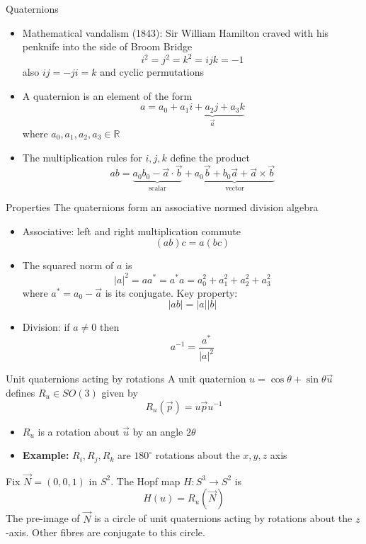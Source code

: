 \documentclass{beamer}
\newcommand{\R}{\mathbb{R}}
\newcommand{\va}{\vec{a}}
\newcommand{\vb}{\vec{b}}
\newcommand{\vu}{\vec{u}}
\newcommand{\vp}{\vec{p}}
\begin{document}
\begin{frame}{Quaternions}
	\begin{itemize}
		\pause
		\item Mathematical vandalism (1843): Sir William Hamilton craved with his penknife into the side of Broom Bridge
		\[
		i^2 = j^2 = k^2 = ijk = -1
		\]
		also \(ij = -ji = k\) and cyclic permutations
		\pause
		\item A quaternion is an element of the form 
		\[
		a = a_0 + \underbrace{a_1 i + a_2 j + a_3 k}_{\va}
		\]
		where \(a_0, a_1, a_2, a_3 \in \R\)
		\pause
		\item The multiplication rules for \(i, j, k\) define the product
		\[
		a b = \underbrace{a_0 b_0 - \va \cdot \vb}_{\text{scalar}} + \underbrace{a_0 \vb + b_0 \va + \va \times \vb}_{\text{vector}}
		\]
	\end{itemize}
\end{frame}

\begin{frame}{Properties}
	The quaternions form an associative normed division algebra 
	\begin{itemize}
		\pause
		\item Associative: left and right multiplication commute
		\[
		(ab)c = a(bc)
		\]
		\pause
		\item The squared norm of \(a\) is
		\[
		|a|^2 = a a^* = a^* a = a_0^2 + a_1^2 + a_2^2 + a_3^2 
		\]
		where \(a^* = a_0 - \va\) is its conjugate. Key property:
		\[
		| ab | = |a| |b|
		\] 
		\pause
		\item Division: if \(a \neq 0\) then
		\[
		a^{-1} = \frac{a^*}{|a|^2}
		\]
	\end{itemize}	
\end{frame}

\begin{frame}{Unit quaternions acting by rotations}
	A unit quaternion \(u = \cos \theta + \sin \theta \vu \) defines \(R_u \in SO(3)\) given by
	\[
	R_u (\vp) = u \vp u^{-1}
	\]
	\begin{itemize}
		\pause
		\item \(R_u\) is a rotation about \(\vu\) by an angle \(2 \theta\)
		\pause
		\item \textbf{Example:} \(R_i, R_j, R_k\) are \(180^{\circ}\) rotations about the \(x, y, z\) axis
	\end{itemize}
	\pause
	Fix \(\vec{N} = (0,0,1)\) in \(S^2\). The Hopf map \(H:S^3 \to S^2\) is
	\[
	H(u) = R_u(\vec{N})
	\]
	\pause
	The pre-image of \(\vec{N}\) is a circle of unit quaternions acting by rotations about the \(z\)-axis. Other fibres are conjugate to this circle.
\end{frame}
\end{document}
